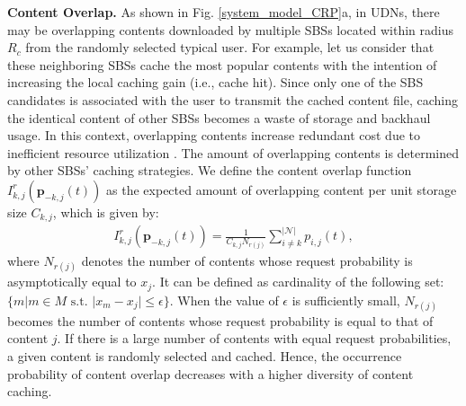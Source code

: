 \documentclass{book}
\begin{document}
    \textbf{Content Overlap.}\quad
     As shown in Fig. \ref{system_model_CRP}a, in UDNs, there may be overlapping contents downloaded by multiple SBSs located within radius $R_c$ from the randomly selected typical user.
    For example, let us consider that these neighboring SBSs cache the most popular contents with the intention of increasing the local caching gain (i.e., cache hit). Since only one of the SBS candidates is associated with the user to transmit the cached content file, caching the identical content of other SBSs becomes a waste of storage and backhaul usage.
    In this context, overlapping contents increase redundant cost due to inefficient resource utilization \cite{social_cost1}. The amount of overlapping contents is determined by other SBSs' caching strategies. 
    We define the content overlap function $I^r_{k,j}(\boldsymbol{p}_{-k,j}(t))$ as the expected amount of overlapping content per unit storage size $C_{k,j}$, which is given by:
    \begin{align}
    I^r_{k,j}(\boldsymbol{p}_{-k,j}(t))=\frac{1}{C_{k,j}N_{r(j)}}\sum^{|\mathcal{N}|}_{i\neq k} {p}_{i,j}(t), \label{interaction_1}
    \end{align}
    \noindent where 
    $N_{r(j)}$ denotes the number of contents whose request probability is asymptotically equal to $x_j$. It can be defined as  cardinality of the following set: $\{ m | m \in {M} \text{ s.t. } |x_m-x_j| \leq \epsilon\}$. When the value of $\epsilon$ is sufficiently small, $N_{r(j)}$ becomes the number of contents whose request probability is equal to that of content $j$.
    If there is a large number of contents with equal request probabilities, a given content is randomly selected and cached. Hence, the occurrence probability of content overlap decreases with a higher diversity of content caching. 
    
    
    
\end{document}
